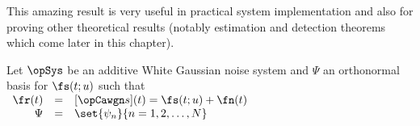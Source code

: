 This amazing result is very useful in practical system implementation
and also for proving other theoretical results
(notably estimation and detection theorems which come later
in this chapter).


\begin{theorem}
\label{thm:sstat}
 
  
Let $\opSys$ be an additive White Gaussian noise system and
$\Psi$ an orthonormal basis for $\fs(t;u)$ such that
\\\indentx$\begin{array}{rcl}
   \fr(t)&=& [\opCawgn s](t) = \fs(t;u) + \fn(t)      \\
   \Psi  &=& \set{\psi_n}{n=1,2,\ldots, N}
\end{array}$
\end{theorem}
